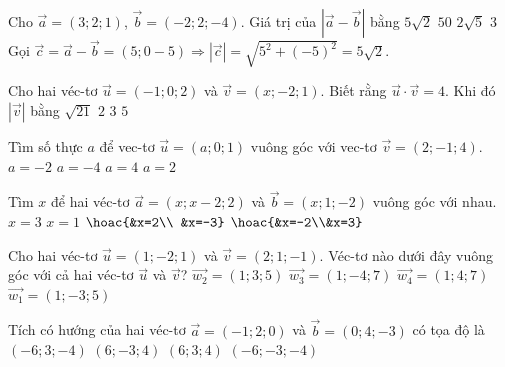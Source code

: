 \begin{ex}
	Cho $\vec{a}=(3;2;1)$, $\vec{b}=(-2;2;-4)$. Giá trị của $\left| \vec{a}-\vec{b} \right|$ bằng
	\choice
	{\True$5\sqrt{2}$}
	{$50$}
	{$2\sqrt{5}$}
	{$3$}
	\loigiai
	{
		Gọi $\vec{c}=\vec{a}-\vec{b}=(5;0-5)\Rightarrow \left| \vec{c} \right|=\sqrt{5^2+(-5)^2}=5\sqrt{2}$.}
\end{ex} 

\begin{ex}
	Cho hai véc-tơ $\vec{u}=(-1;0;2)$ và $\vec{v}=(x;-2;1)$. Biết rằng $\vec{u}\cdot \vec{v}=4$. Khi đó $|\vec{v}|$ bằng
	\choice
	{$\sqrt{21}$}
	{$2$}
	{\True $3$}
	{$5$}
\end{ex} 

\begin{ex}%
	Tìm số thực $a$ để vec-tơ $\vec{u}=(a;0;1)$ vuông góc với vec-tơ $\vec{v}=(2;-1;4)$.
	\choice
	{\True $a=-2$}
	{$a=-4$}
	{$a=4$}
	{$a=2$}
\end{ex} 

\begin{ex}
	Tìm $x$ để hai véc-tơ $\vec{a}=(x;x-2;2)$ và $\vec{b}=(x;1;-2)$ vuông góc với nhau.
	\choice
	{$x=3$}
	{$x=1$}
	{\True $\hoac{&x=2\\ &x=-3}$}
	{$\hoac{&x=-2\\&x=3}$}
\end{ex} 

\begin{ex}
	Cho hai véc-tơ $\vec{u}=(1;-2;1)$ và $\vec{v}=(2;1;-1)$. Véc-tơ nào dưới đây vuông góc với cả hai véc-tơ $\vec{u}$ và $\vec{v}$?
	\choice
	{\True $\vec{w_2}=(1;3;5)$}
	{$\vec{w_3}=(1;-4;7)$}
	{$\vec{w_4}=(1;4;7)$}
	{$\vec{w_1}=(1;-3;5)$}
\end{ex} 

\begin{ex}
	Tích có hướng của hai véc-tơ $\vec{a}=(-1;2;0)$ và $\vec{b}=(0;4;-3)$ có tọa độ là
	\choice
	{$(-6;3;-4)$}
	{$(6;-3;4)$}
	{$(6;3;4)$}
	{\True $(-6;-3;-4)$}
\end{ex} 

